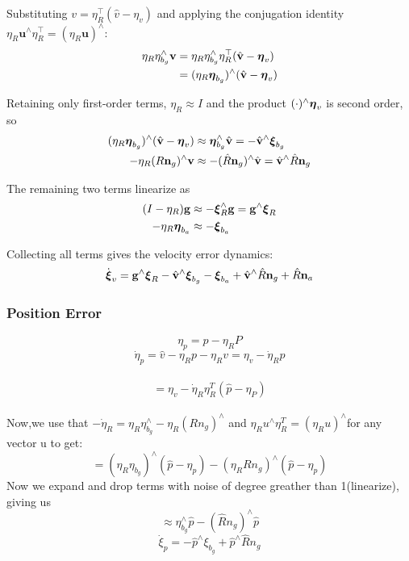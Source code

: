 Substituting ${v} = \eta_R^\top(\hat{{v}} - \eta_v)$ and applying
the conjugation identity $\eta_R\mathbf{u}^\wedge\eta_R^\top =
(\eta_R\mathbf{u})^\wedge$:
\begin{equation}
  \begin{aligned}
    \eta_R\eta_{b_g}^\wedge\mathbf{v}
      &= \eta_R\eta_{b_g}^\wedge\eta_R^\top(\hat{\mathbf{v}} - \boldsymbol{\eta}_v) \\
      &= (\eta_R\boldsymbol{\eta}_{b_g})^\wedge(\hat{\mathbf{v}} - \boldsymbol{\eta}_v)
  \end{aligned}
\end{equation}

Retaining only first-order terms, $\eta_R \approx I$ and the product
$(\cdot)^\wedge\boldsymbol{\eta}_v$ is second order, so
\begin{equation}
  \begin{aligned}
    (\eta_R\boldsymbol{\eta}_{b_g})^\wedge(\hat{\mathbf{v}} - \boldsymbol{\eta}_v)
      &\approx \boldsymbol{\eta}_{b_g}^\wedge\hat{\mathbf{v}}
       = -\hat{\mathbf{v}}^\wedge\boldsymbol{\xi}_{b_g} \\
    -\eta_R(R\mathbf{n}_g)^\wedge\mathbf{v}
      &\approx -(\hat{R}\mathbf{n}_g)^\wedge\hat{\mathbf{v}}
       = \hat{\mathbf{v}}^\wedge\hat{R}\mathbf{n}_g
  \end{aligned}
\end{equation}

The remaining two terms linearize as
\begin{equation}
  \begin{aligned}
    (I - \eta_R)\mathbf{g} &\approx -\boldsymbol{\xi}_R^\wedge\mathbf{g}
      = \mathbf{g}^\wedge\boldsymbol{\xi}_R \\
    -\eta_R\boldsymbol{\eta}_{b_a} &\approx -\boldsymbol{\xi}_{b_a}
  \end{aligned}
\end{equation}

Collecting all terms gives the velocity error dynamics:
\begin{equation}
  \dot{\boldsymbol{\xi}}_v = \mathbf{g}^\wedge\boldsymbol{\xi}_R - \hat{\mathbf{v}}^\wedge\boldsymbol{\xi}_{b_g}
    - \boldsymbol{\xi}_{b_a} + \hat{\mathbf{v}}^\wedge\hat{R}\mathbf{n}_g
    + \hat{R}\mathbf{n}_a
  \label{eq:vel_error}
\end{equation}
\subsubsection{Position Error}
$$\eta_p = \hat p - \eta_R P$$
$$\dot \eta_p = \hat v-\eta_R p - \eta_Rv=\eta_v-\dot \eta_Rp$$\\
$$=\eta_v-\dot \eta_R\eta_R^T(\hat p -\eta_P)$$\\
Now,we use that $-\dot\eta_R = \eta_R\eta_{b_g}^\wedge - \eta_R(Rn_g)^\wedge$ and $\eta_R u^\wedge \eta_R^T = (\eta_R u)^\wedge$for any vector u 
to get:\\

$$= (\eta_R\eta_{b_g})^\wedge(\hat{{p}} - \eta_p) - (\eta_R R{n}_g)^\wedge(\hat{p} - \eta_p)$$
Now we expand and drop terms with noise of degree greather than 1(linearize), giving us
$$\approx \eta_{b_g}^\wedge \hat p - (\hat R n_g)^\wedge\hat p$$
\begin{equation}
  \dot \xi_p =-\hat p^\wedge \xi_{b_g}+\hat p^\wedge \hat R n_g 
\end{equation}

